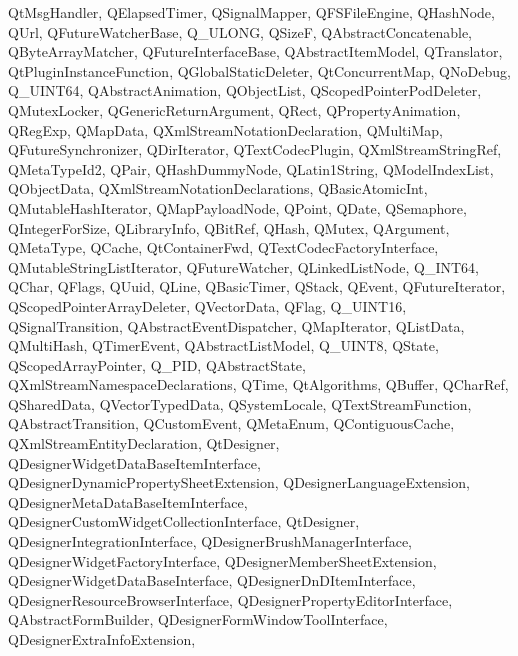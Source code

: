 {{    QtMsgHandler,%
    QElapsedTimer,%
    QSignalMapper,%
    QFSFileEngine,%
    QHashNode,%
    QUrl,%
    QFutureWatcherBase,%
    Q_ULONG,%
    QSizeF,%
    QAbstractConcatenable,%
    QByteArrayMatcher,%
    QFutureInterfaceBase,%
    QAbstractItemModel,%
    QTranslator,%
    QtPluginInstanceFunction,%
    QGlobalStaticDeleter,%
    QtConcurrentMap,%
    QNoDebug,%
    Q_UINT64,%
    QAbstractAnimation,%
    QObjectList,%
    QScopedPointerPodDeleter,%
    QMutexLocker,%
    QGenericReturnArgument,%
    QRect,%
    QPropertyAnimation,%
    QRegExp,%
    QMapData,%
    QXmlStreamNotationDeclaration,%
    QMultiMap,%
    QFutureSynchronizer,%
    QDirIterator,%
    QTextCodecPlugin,%
    QXmlStreamStringRef,%
    QMetaTypeId2,%
    QPair,%
    QHashDummyNode,%
    QLatin1String,%
    QModelIndexList,%
    QObjectData,%
    QXmlStreamNotationDeclarations,%
    QBasicAtomicInt,%
    QMutableHashIterator,%
    QMapPayloadNode,%
    QPoint,%
    QDate,%
    QSemaphore,%
    QIntegerForSize,%
    QLibraryInfo,%
    QBitRef,%
    QHash,%
    QMutex,%
    QArgument,%
    QMetaType,%
    QCache,%
    QtContainerFwd,%
    QTextCodecFactoryInterface,%
    QMutableStringListIterator,%
    QFutureWatcher,%
    QLinkedListNode,%
    Q_INT64,%
    QChar,%
    QFlags,%
    QUuid,%
    QLine,%
    QBasicTimer,%
    QStack,%
    QEvent,%
    QFutureIterator,%
    QScopedPointerArrayDeleter,%
    QVectorData,%
    QFlag,%
    Q_UINT16,%
    QSignalTransition,%
    QAbstractEventDispatcher,%
    QMapIterator,%
    QListData,%
    QMultiHash,%
    QTimerEvent,%
    QAbstractListModel,%
    Q_UINT8,%
    QState,%
    QScopedArrayPointer,%
    Q_PID,%
    QAbstractState,%
    QXmlStreamNamespaceDeclarations,%
    QTime,%
    QtAlgorithms,%
    QBuffer,%
    QCharRef,%
    QSharedData,%
    QVectorTypedData,%
    QSystemLocale,%
    QTextStreamFunction,%
    QAbstractTransition,%
    QCustomEvent,%
    QMetaEnum,%
    QContiguousCache,%
    QXmlStreamEntityDeclaration,%
    QtDesigner,%
    QDesignerWidgetDataBaseItemInterface,%
    QDesignerDynamicPropertySheetExtension,%
    QDesignerLanguageExtension,%
    QDesignerMetaDataBaseItemInterface,%
    QDesignerCustomWidgetCollectionInterface,%
    QtDesigner,%
    QDesignerIntegrationInterface,%
    QDesignerBrushManagerInterface,%
    QDesignerWidgetFactoryInterface,%
    QDesignerMemberSheetExtension,%
    QDesignerWidgetDataBaseInterface,%
    QDesignerDnDItemInterface,%
    QDesignerResourceBrowserInterface,%
    QDesignerPropertyEditorInterface,%
    QAbstractFormBuilder,%
    QDesignerFormWindowToolInterface,%
    QDesignerExtraInfoExtension,%
}}
